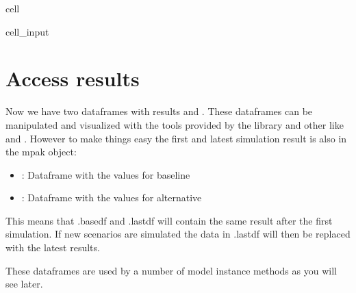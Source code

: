 \documentclass[letterpaper,10pt,english]{jupyterBook}
\begin{document}
\begin{sphinxuseclass}{cell}\begin{sphinxVerbatimInput}

\begin{sphinxuseclass}{cell_input}
\begin{sphinxVerbatim}[commandchars=\\\{\}]
   
\end{sphinxVerbatim}

\end{sphinxuseclass}\end{sphinxVerbatimInput}

\end{sphinxuseclass}

\section{Access results}
\label{\detokenize{content/notebooks/modelflow_features:access-results}}
\sphinxAtStartPar
Now we have two dataframes with results  and . These dataframes can be manipulated and visualized
with the tools provided by the  library and other like  and . However to make things easy the first and
latest simulation result is also in the mpak object:
\begin{itemize}
\item {} 
\sphinxAtStartPar
{}: Dataframe with the values for baseline

\item {} 
\sphinxAtStartPar
{}: Dataframe with the values for alternative

\end{itemize}

\sphinxAtStartPar
This means that .basedf and .lastdf will contain the same result after the first simulation. 
If new scenarios are simulated the data in .lastdf will then be replaced with the latest results.

\sphinxAtStartPar
These dataframes are used by a number of model instance methods as you will see later.
\end{document}
